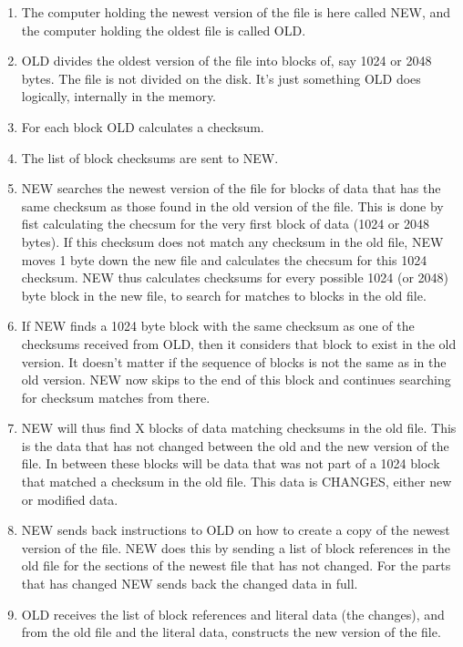 \documentclass{article}
\begin{document}
\begin{enumerate}
\item The computer holding the newest version of the file is here called NEW, and the computer holding the oldest file is called OLD.
\item OLD divides the oldest version of the file into blocks of, say 1024 or 2048 bytes. The file is not divided on the disk. It's just something OLD does logically, internally in the memory.
\item For each block OLD calculates a checksum.
\item The list of block checksums are sent to NEW.
\item NEW searches the newest version of the file for blocks of data that has the same checksum as those found in the old version of the file. This is done by fist calculating the checsum for the very first block of data (1024 or 2048 bytes). If this checksum does not match any checksum in the old file, NEW moves 1 byte down the new file and calculates the checsum for this 1024 checksum. NEW thus calculates checksums for every possible 1024 (or 2048) byte block in the new file, to search for matches to blocks in the old file.
\item If NEW finds a 1024 byte block with the same checksum as one of the checksums received from OLD, then it considers that block to exist in the old version. It doesn't matter if the sequence of blocks is not the same as in the old version. NEW now skips to the end of this block and continues searching for checksum matches from there.
\item NEW will thus find X blocks of data matching checksums in the old file. This is the data that has not changed between the old and the new version of the file. In between these blocks will be data that was not part of a 1024 block that matched a checksum in the old file. This data is CHANGES, either new or modified data.
\item NEW sends back instructions to OLD on how to create a copy of the newest version of the file. NEW does this by sending a list of block references in the old file for the sections of the newest file that has not changed. For the parts that has changed NEW sends back the changed data in full.
\item OLD receives the list of block references and literal data (the changes), and from the old file and the literal data, constructs the new version of the file.
\end{enumerate}
\end{document}
